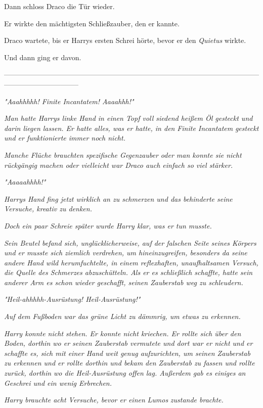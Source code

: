 {Dann schloss Draco die Tür wieder.

Er wirkte den mächtigsten Schließzauber, den er kannte.

Draco wartete, bis er Harrys ersten Schrei hörte, bevor er den \emph{Quietus} wirkte.

Und dann ging er davon.

--------------------------------------------------------------------------------------------------------------------------------------------

\emph{"\emph{Aaahhhhh! Finite Incantatem! Aaaahhh!}"}

\emph{Man hatte Harrys linke Hand in einen Topf voll siedend heißem Öl gesteckt und darin liegen lassen. Er hatte alles, was er hatte, in den} \emph{\emph{Finite Incantatem}} \emph{gesteckt und er funktionierte immer noch nicht.}

\emph{Manche Flüche brauchten spezifische Gegenzauber oder man konnte sie nicht rückgängig machen oder vielleicht war Draco auch einfach so viel stärker.}

\emph{"\emph{Aaaaahhhh!}"}

\emph{Harrys Hand fing jetzt wirklich an zu schmerzen und das behinderte seine Versuche, kreativ zu denken.}

\emph{Doch ein paar Schreie später wurde Harry klar, was er tun musste.}

\emph{Sein Beutel befand sich, unglücklicherweise, auf der falschen Seite seines Körpers und er musste sich ziemlich verdrehen, um hineinzugreifen, besonders da seine andere Hand wild herumfuchtelte, in einem reflexhaften, unaufhaltsamen Versuch, die Quelle des Schmerzes abzuschütteln. Als er es schließlich schaffte, hatte sein anderer Arm es schon wieder geschafft, seinen Zauberstab weg zu schleudern.}

\emph{"Heil-\emph{ahhhhh}-Ausrüstung! Heil-Ausrüstung!"}

\emph{Auf dem Fußboden war das grüne Licht zu dämmrig, um etwas zu erkennen.}

\emph{Harry konnte nicht stehen. Er konnte nicht kriechen. Er rollte sich über den Boden, dorthin wo er seinen Zauberstab vermutete und dort war er nicht und er schaffte es, sich mit einer Hand weit genug aufzurichten, um seinen Zauberstab zu erkennen und er rollte dorthin und bekam den Zauberstab zu fassen und rollte zurück, dorthin wo die Heil-Ausrüstung offen lag. Außerdem gab es einiges an Geschrei und ein wenig Erbrechen.}

\emph{Harry brauchte acht Versuche, bevor er einen} \emph{\emph{Lumos}} \emph{zustande brachte.}

}
